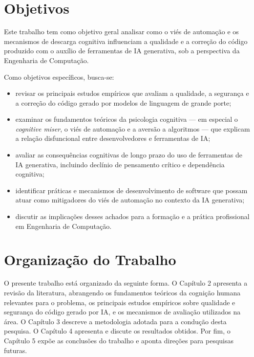 \section{Objetivos}

Este trabalho tem como objetivo geral analisar como o viés de automação e os mecanismos de descarga cognitiva influenciam a qualidade e a correção do código produzido com o auxílio de ferramentas de IA generativa, sob a perspectiva da Engenharia de Computação.

Como objetivos específicos, busca-se:

\begin{itemize}
	\item revisar os principais estudos empíricos que avaliam a qualidade, a segurança e a correção do código gerado por modelos de linguagem de grande porte;
	\item examinar os fundamentos teóricos da psicologia cognitiva — em especial o \textit{cognitive miser}, o viés de automação e a aversão a algoritmos — que explicam a relação disfuncional entre desenvolvedores e ferramentas de IA;
	\item avaliar as consequências cognitivas de longo prazo do uso de ferramentas de IA generativa, incluindo declínio de pensamento crítico e dependência cognitiva;
	\item identificar práticas e mecanismos de desenvolvimento de software que possam atuar como mitigadores do viés de automação no contexto da IA generativa;
	\item discutir as implicações desses achados para a formação e a prática profissional em Engenharia de Computação.
\end{itemize}

\section{Organização do Trabalho}

O presente trabalho está organizado da seguinte forma. O Capítulo 2 apresenta a revisão da literatura, abrangendo os fundamentos teóricos da cognição humana relevantes para o problema, os principais estudos empíricos sobre qualidade e segurança do código gerado por IA, e os mecanismos de avaliação utilizados na área. O Capítulo 3 descreve a metodologia adotada para a condução desta pesquisa. O Capítulo 4 apresenta e discute os resultados obtidos. Por fim, o Capítulo 5 expõe as conclusões do trabalho e aponta direções para pesquisas futuras.


